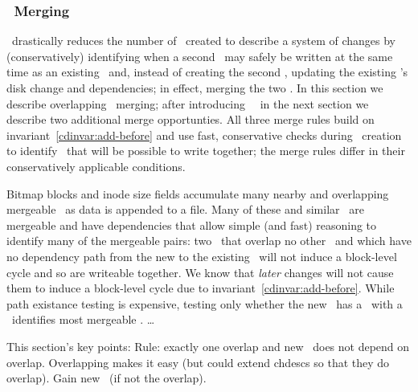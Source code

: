 \subsubsection{\ChDesc\ Merging}
\Kudos\ drastically reduces the number of \chdescs\ created to
describe a system of changes by (conservatively) identifying when a
second \chdesc\ may safely be written at the same time as an existing
\chdesc\ and, instead of creating the second \chdesc, updating the
existing \chdesc's disk change and dependencies; in effect, merging
the two \chdescs.
%
In this section we describe overlapping \chdesc\ merging; after
introducing \nrb\ \chdescs\ in the next section we describe
two additional merge opportunties.
%
All three merge rules build on invariant~\ref{cdinvar:add-before}
and use fast, conservative checks during \chdesc\ creation to identify
\chdescs\ that will be possible to write together;
%
the merge rules differ in their conservatively applicable conditions.

Bitmap blocks and inode size fields accumulate many nearby and
overlapping mergeable \chdescs\ as data is appended to a file.
%
Many of these and similar \chdescs\ are mergeable and have
dependencies that allow simple (and fast) reasoning to identify many
of the mergeable pairs: two \chdescs\ that overlap no other \chdescs\
and which have no dependency path from the new to the existing \chdesc\
will not induce a block-level cycle and so are writeable together.
We know that \textit{later} changes will not cause them to induce a block-level cycle due to
invariant~\ref{cdinvar:add-before}.
%
While path existance testing is expensive, testing only whether the new
\chdesc\ has a \before\ with a \before\ identifies most mergeable
\chdescs. \ldots

This section's key points:
Rule: exactly one overlap and new \before\ does not depend on overlap.
Overlapping makes it easy (but could extend chdescs so that they do overlap).
Gain new \before\ (if not the overlap).

